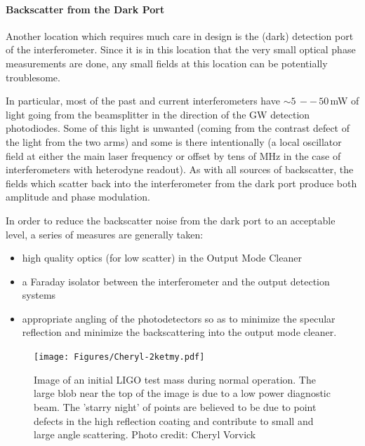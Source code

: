 \paragraph{Backscatter from the Dark Port}
Another location which requires much care in design is the (dark)
detection port of the interferometer. Since it is in this location
that the very small optical phase measurements are done, any small
fields at this location can be potentially troublesome.

In particular, most of the past and current interferometers have
$\sim5\,--\,50$\,mW of light going from the beamsplitter in the
direction of the GW detection photodiodes. Some of this light is
unwanted (coming from the contrast defect of the light from the two
arms) and some is there intentionally (a local oscillator field at
either the main laser frequency or offset by tens of MHz in the case
of interferometers with heterodyne readout). As with all sources of
backscatter, the fields which scatter back into the interferometer
from the dark port produce both amplitude and phase modulation.

In order to reduce the backscatter noise from the dark port to an
acceptable level, a series of measures are generally taken:
\begin{itemize}
\item high quality optics (for low scatter) in the Output Mode Cleaner
\item a Faraday isolator between the interferometer and the output
  detection systems
\item appropriate angling of the photodetectors so as to minimize the
  specular reflection and minimize the backscattering into the output
  mode cleaner.
\end{itemize}


\begin{figure}[h]
  \centering
    \texttt{[image: Figures/Cheryl-2ketmy.pdf]}
    \caption[Point defects in a LIGO mirror]{Image of an initial LIGO 
      test mass during normal operation. The large blob near the top
      of the image is due to a low power diagnostic beam. The 
      'starry night' of points are believed to be due to point 
      defects in the high reflection coating and contribute to small 
      and large angle scattering. Photo credit: Cheryl Vorvick}
    \label{fig:2kETMy}
\end{figure}


